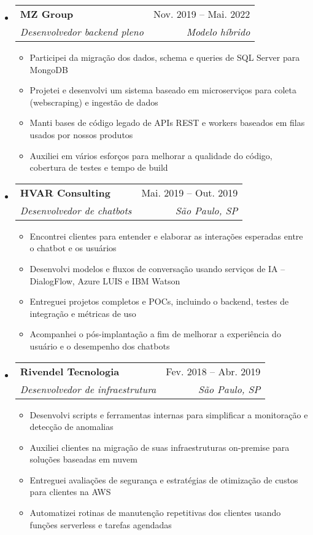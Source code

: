 \documentclass[letterpaper,12pt]{article}[leftmargin=*]
\makeatletter
\def \entryspacing {-0pt}
\newcommand{\resumeEntryStart}{\begin{itemize}[leftmargin=2.5mm]}
\newcommand{\resumeEntryEnd}{\end{itemize}\vspace{\entryspacing}}
\newcommand{\resumeItemListStart}{\begin{itemize}[leftmargin=4.5mm]}
\newcommand{\resumeItemListEnd}{\end{itemize}}
\newcommand{\resumeItem}[1]{
  \item\small{
    {#1 \vspace{-2pt}}
  }
}
\newcommand{\resumeEntryTSDL}[4]{
  \vspace{-1pt}\item[]
    \begin{tabularx}{0.97\textwidth}{X@{\hspace{60pt}}r}
      \textbf{\color{primary}#1} & {\firabook\color{accent}\small#2} \\
      \textit{\color{accent}\small#3} & \textit{\color{accent}\small#4} \\
    \end{tabularx}\vspace{-6pt}
}
\makeatother
\begin{document}
  \resumeEntryStart
    \resumeEntryTSDL
      {MZ Group}{Nov. 2019 -- Mai. 2022}
      {Desenvolvedor backend pleno}{Modelo híbrido}
    \resumeItemListStart
      \resumeItem {Participei da migração dos dados, schema e queries de SQL Server para MongoDB}
      \resumeItem {Projetei e desenvolvi um sistema baseado em microserviços para coleta (webscraping) e ingestão de dados}
      \resumeItem {Manti bases de código legado de APIs REST e workers baseados em filas usados por nossos produtos}
      \resumeItem {Auxiliei em vários esforços para melhorar a qualidade do código, cobertura de testes e tempo de build}
    \resumeItemListEnd
  \resumeEntryEnd

  \resumeEntryStart
    \resumeEntryTSDL
      {HVAR Consulting}{Mai. 2019 -- Out. 2019}
      {Desenvolvedor de chatbots}{São Paulo, SP}
    \resumeItemListStart
        \resumeItem {Encontrei clientes para entender e elaborar as interações esperadas entre o chatbot e os usuários}
        \resumeItem {Desenvolvi modelos e fluxos de conversação usando serviços de IA -- DialogFlow, Azure LUIS e IBM Watson}
        \resumeItem {Entreguei projetos completos e POCs, incluindo o backend, testes de integração e métricas de uso}
        \resumeItem {Acompanhei o pós-implantação a fim de melhorar a experiência do usuário e o desempenho dos chatbots}
    \resumeItemListEnd
  \resumeEntryEnd

  \resumeEntryStart
    \resumeEntryTSDL
      {Rivendel Tecnologia}{Fev. 2018 -- Abr. 2019}
      {Desenvolvedor de infraestrutura}{São Paulo, SP}
    \resumeItemListStart
      \resumeItem {Desenvolvi scripts e ferramentas internas para simplificar a monitoração e detecção de anomalias}
      \resumeItem {Auxiliei clientes na migração de suas infraestruturas on-premise para soluções baseadas em nuvem}
      \resumeItem {Entreguei avaliações de segurança e estratégias de otimização de custos para clientes na AWS}
      \resumeItem {Automatizei rotinas de manutenção repetitivas dos clientes usando funções serverless e tarefas agendadas}
    \resumeItemListEnd
  \resumeEntryEnd
\end{document}
